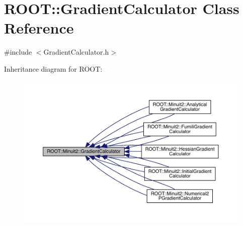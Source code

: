 \hypertarget{classROOT_1_1Minuit2_1_1GradientCalculator}{}\section{R\+O\+OT\+:\+:Gradient\+Calculator Class Reference}
\label{classROOT_1_1Minuit2_1_1GradientCalculator}


{\ttfamily \#include $<$Gradient\+Calculator.\+h$>$}



Inheritance diagram for R\+O\+OT\+:
\nopagebreak
\begin{figure}[H]
\begin{center}
\leavevmode
\includegraphics[width=350pt]{dd/dd0/classROOT_1_1Minuit2_1_1GradientCalculator__inherit__graph}
\end{center}
\end{figure}
